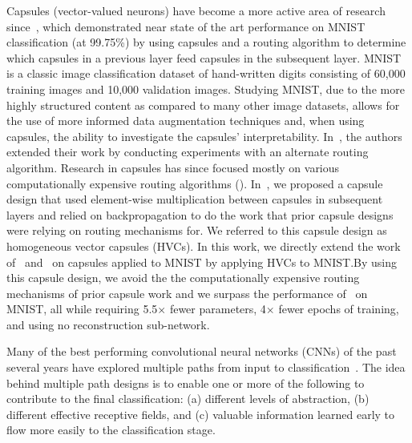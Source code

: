 \documentclass{article}
\begin{document}
Capsules (vector-valued neurons) have become a more active area of research since~\cite{Sabour2017}, which demonstrated near state of the art performance on MNIST~\cite{Lecun2010} classification (at 99.75\%) by using capsules and a routing algorithm to determine which capsules in a previous layer feed capsules in the subsequent layer.  MNIST is a classic image classification dataset of hand-written digits consisting of 60,000 training images and 10,000 validation images.  Studying MNIST, due to the more highly structured content as compared to many other image datasets, allows for the use of more informed data augmentation techniques and, when using capsules, the ability to investigate the capsules' interpretability.  In~\cite{Hinton2018}, the authors extended their work by conducting experiments with an alternate routing algorithm.  Research in capsules has since focused mostly on various computationally expensive routing algorithms (\cite{Venkataraman2020}\cite{Amer2020}).  In~\cite{Byerly2019}, we proposed a capsule design that used element-wise multiplication between capsules in subsequent layers and relied on backpropagation to do the work that prior capsule designs were relying on routing mechanisms for.  We referred to this capsule design as homogeneous vector capsules (HVCs).  In this work, we directly extend the work of~\cite{Hinton2011} and~\cite{Sabour2017} on capsules applied to MNIST by applying HVCs to MNIST.\@ By using this capsule design, we avoid the the computationally expensive routing mechanisms of prior capsule work and we surpass the performance of~\cite{Sabour2017} on MNIST, all while requiring 5.5\(\times{}\) fewer parameters, 4\(\times{}\) fewer epochs of training, and using no reconstruction sub-network.

Many of the best performing convolutional neural networks (CNNs) of the past several years have explored multiple paths from input to classification~\cite{Szegedy2015a}\cite{Szegedy2015b}\cite{He2015}\cite{Zhou2020}\cite{Wang2020}\cite{Ciresan2012}.  The idea behind multiple path designs is to enable one or more of the following to contribute to the final classification: (a) different levels of abstraction, (b) different effective receptive fields, and (c) valuable information learned early to flow more easily to the classification stage.
\end{document}
